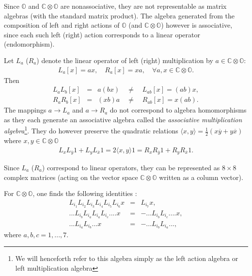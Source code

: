 \documentclass{article}
\newcommand{\bb}[1]{\mathbb{#1}}
\begin{document}


Since $\bb{O}$ and $\bb{C}\otimes\bb{O}$ are nonassociative, they are not representable as matrix algebras (with the standard matrix product). The algebra generated from the composition of left and right actions of $\bb{O}$ (and $\bb{C}\otimes\bb{O}$) however is associative, since each such left (right) action corresponds to a linear operator (endomorphism). 

Let $L_a$ ($R_a$) denote the linear operator of left (right) multiplication by $a\in\bb{C}\otimes\bb{O}$:
\begin{eqnarray}
    L_a[x]=ax,\quad R_a[x]=xa,\quad \forall a,x\in  \bb{C}\otimes\bb{O}.
\end{eqnarray}
Then
\begin{eqnarray}
    L_aL_b[x]&=&a(bx) \quad \neq \quad L_{ab}[x]=(ab)x,\\
    R_aR_b[x]&=&(xb)a \quad \neq \quad R_{ab}[x]=x(ab).
\end{eqnarray}
The mappings $a\rightarrow L_a$ and $a\rightarrow R_a$ do not correspond to algebra homomorphisms as they each generate an associative algebra called the \textit{associative multiplication algebra}\footnote{We will henceforth refer to this algebra simply as the left action algebra or left multiplication algebra}. They do however preserve the quadratic relations $\langle x,y\rangle=\frac{1}{2}(x\overline{y}+y\overline{x})$ where $x,y\in \bb{C}\otimes\bb{O}$
\begin{eqnarray}
    L_xL_{\overline{y}}1+L_yL_{\overline{x}}1=2\langle x,y \rangle 1=R_xR_{\overline{y}}1+R_yR_{\overline{x}}1.
\end{eqnarray}

Since $L_a$ ($R_a$) correspond to linear operators, they can be represented as $8\times 8$ complex matrices (acting on the vector space $\bb{C}\otimes\bb{O}$ written as a column vector).

For $\bb{C}\otimes\bb{O}$, one finds the following identities \cite{dixon2013division,furey2016standard}:
\begin{eqnarray}
    L_{i_1}L_{i_2}L_{i_3}L_{i_4}L_{i_5}L_{i_6}x&=&L_{i_7}x,\\
    ...L_{i_b}L_{i_a}L_{i_a}L_{i_c}....x&=&-...L_{i_b}L_{i_c}....x,\\
    ...L_{i_a}L_{i_b}...x&=&-...L_{i_b}L_{i_a}...,
\end{eqnarray}
where $a,b,c=1,...,7$.
\end{document}
